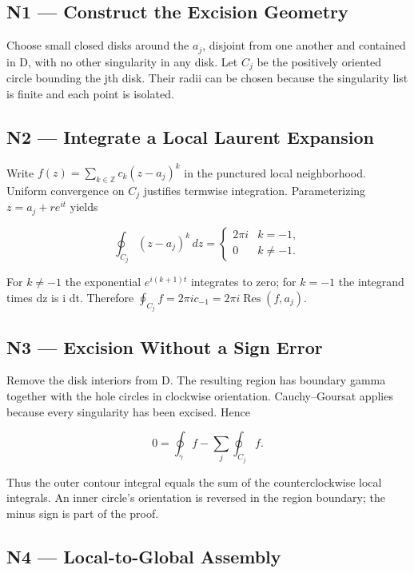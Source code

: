\documentclass[preprint,12pt,aps,pra,showkeys,amsmath,amssymb,superscriptaddress,floatfix]{revtex4-2}
\theoremstyle{definition}
\theoremstyle{remark}
\begin{document}
\subsection{N1 --- Construct the Excision
Geometry}\label{n1-construct-the-excision-geometry}

Choose small closed disks around the \(a_j\), disjoint from one another
and contained in D, with no other singularity in any disk. Let \(C_j\)
be the positively oriented circle bounding the jth disk. Their radii can
be chosen because the singularity list is finite and each point is
isolated.

\subsection{N2 --- Integrate a Local Laurent
Expansion}\label{n2-integrate-a-local-laurent-expansion}

Write \(f(z)=\sum_{k\in\mathbb Z}c_k(z-a_j)^k\) in the punctured local
neighborhood. Uniform convergence on \(C_j\) justifies termwise
integration. Parameterizing \(z=a_j+re^{it}\) yields

\[\oint_{C_j}(z-a_j)^k\,dz=\begin{cases}2\pi i&k=-1,\\0&k\ne-1.\end{cases}\]

For \(k\ne -1\) the exponential \(e^{i(k+1)t}\) integrates to zero; for
\(k=-1\) the integrand times dz is i dt. Therefore
\(\oint_{C_j}f=2\pi i c_{-1}=2\pi i\operatorname{Res}(f,a_j)\).

\subsection{N3 --- Excision Without a Sign
Error}\label{n3-excision-without-a-sign-error}

Remove the disk interiors from D. The resulting region has boundary
gamma together with the hole circles in clockwise orientation.
Cauchy--Goursat applies because every singularity has been excised.
Hence

\[0=\oint_\gamma f-\sum_j\oint_{C_j}f.\]

Thus the outer contour integral equals the sum of the counterclockwise
local integrals. An inner circle's orientation is reversed in the region
boundary; the minus sign is part of the proof.

\subsection{N4 --- Local-to-Global
Assembly}\label{n4-local-to-global-assembly}
\end{document}
